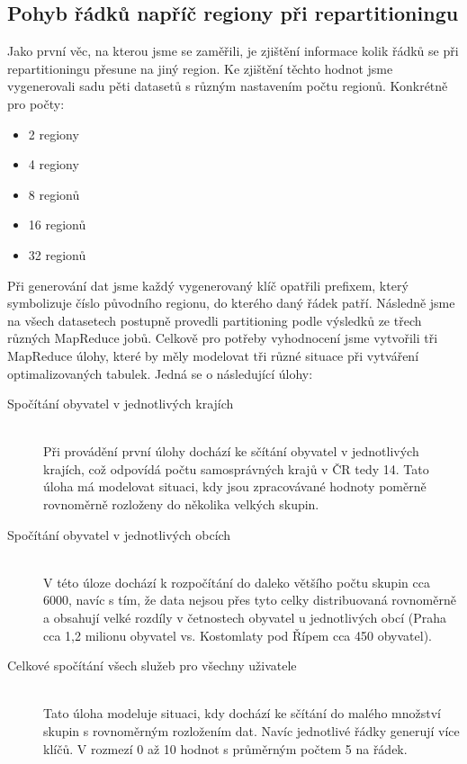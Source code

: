 \documentclass[thesis=M,czech]{FITthesis}[2012/06/26]
\begin{document}
\subsection{Pohyb řádků napříč regiony při repartitioningu}
Jako první věc, na kterou jsme se zaměřili, je zjištění informace kolik řádků se při repartitioningu přesune na jiný region. Ke zjištění těchto hodnot jsme vygenerovali sadu pěti datasetů s různým nastavením počtu regionů. Konkrétně pro počty:
\begin{itemize}
	\item 2 regiony
	\item 4 regiony
	\item 8 regionů
	\item 16 regionů
	\item 32 regionů	
\end{itemize} 
 

Při generování dat jsme každý vygenerovaný klíč opatřili prefixem, který symbolizuje číslo původního regionu, do kterého daný řádek patří. Následně jsme na všech datasetech postupně provedli partitioning podle výsledků ze třech různých MapReduce jobů. Celkově pro potřeby vyhodnocení jsme vytvořili tři MapReduce úlohy, které by měly modelovat tři různé situace při vytváření optimalizovaných tabulek. Jedná se o následující úlohy:
\begin{description}
\item [Spočítání obyvatel v jednotlivých krajích] \hfill \\
Při provádění první úlohy dochází ke sčítání obyvatel v jednotlivých krajích, což odpovídá počtu samosprávných krajů v ČR tedy 14. Tato úloha má modelovat situaci, kdy jsou zpracovávané hodnoty poměrně rovnoměrně rozloženy do několika velkých skupin. 

\item [Spočítání obyvatel v jednotlivých obcích] \hfill \\
V této úloze dochází k rozpočítání do daleko většího počtu skupin cca 6000, navíc s tím, že data nejsou přes tyto celky distribuovaná rovnoměrně a obsahují velké rozdíly v četnostech obyvatel u jednotlivých obcí (Praha cca 1,2 milionu obyvatel vs. Kostomlaty pod Řípem cca 450 obyvatel).
\item [Celkové spočítání všech služeb pro všechny uživatele] \hfill \\
Tato úloha modeluje situaci, kdy dochází ke sčítání do malého množství skupin s rovnoměrným rozložením dat. Navíc jednotlivé řádky generují více klíčů. V rozmezí 0 až 10 hodnot s průměrným počtem 5 na řádek.
\end{description}
\end{document}
